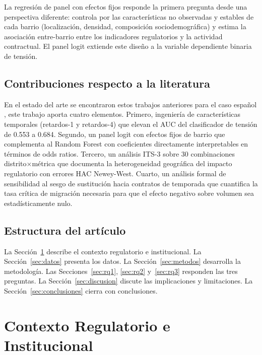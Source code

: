\documentclass[10pt,a4paper,twocolumn]{article}
\begin{document}
La regresión de panel con efectos fijos responde la primera pregunta desde una
perspectiva diferente: controla por las características no observadas y estables de
cada barrio (localización, densidad, composición sociodemográfica) y estima la
asociación entre-barrio entre los indicadores regulatorios y la actividad contractual.
El panel logit extiende este diseño a la variable dependiente binaria de tensión.

\subsection*{Contribuciones respecto a la literatura}

En el estado del arte se encontraron estos trabajos anteriores para el caso español \citep{garcia2018housing,bosch2021ley11},
este trabajo aporta cuatro elementos. Primero, ingeniería de características temporales
(retardos-1 y retardos-4) que elevan el AUC del clasificador de tensión de 0.553 a 0.684.
Segundo, un panel logit con efectos fijos de barrio que complementa al Random Forest
con coeficientes directamente interpretables en términos de odds ratios. Tercero, un
análisis ITS-3 sobre 30 combinaciones distrito$\times$métrica que documenta la
heterogeneidad geográfica del impacto regulatorio con errores HAC Newey-West.
Cuarto, un análisis formal de sensibilidad al sesgo de sustitución hacia contratos
de temporada que cuantifica la tasa crítica de migración necesaria para que el
efecto negativo sobre volumen sea estadísticamente nulo.

\subsection*{Estructura del artículo}

La Sección~\ref{sec:contexto} describe el contexto regulatorio e institucional.
La Sección~\ref{sec:datos} presenta los datos.
La Sección~\ref{sec:metodos} desarrolla la metodología.
Las Secciones~\ref{sec:rq1}, \ref{sec:rq2} y~\ref{sec:rq3} responden las tres preguntas.
La Sección~\ref{sec:discusion} discute las implicaciones y limitaciones.
La Sección~\ref{sec:conclusiones} cierra con conclusiones.

\section{Contexto Regulatorio e Institucional}
\label{sec:contexto}
\end{document}
